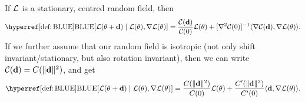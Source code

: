 \begin{lemma}
	If \(\mathcal{L}\) is a stationary, centred random field, then
	\begin{equation*}
		\BLUE[\Loss(\param + \step)\mid \Loss(\param), \nabla\Loss(\param)]
		= \frac{\C(\step)}{\C(0)} \Loss(\param)
		+ [\nabla^2\C(0)]^{-1} \langle \nabla \C(\step), \nabla\Loss(\param)\rangle.
	\end{equation*}
	If we further assume that our random field is isotropic (not only shift
	invariant/stationary, but also rotation invariant), then we can
	write \(\mathcal{C}(\mathbf{d})=C(\|\mathbf{d}\|^2)\), and get
	\begin{equation*}
		\BLUE[\Loss(\param + \step)\mid \Loss(\param), \nabla\Loss(\param)]
		= \frac{\iC(\|\step\|^2)}{\iC(0)} \Loss(\param)
		+ \frac{\iC'(\|\step\|^2)}{\iC'(0)} \langle \step, \nabla\Loss(\param)\rangle.
	\end{equation*}
\end{lemma}
